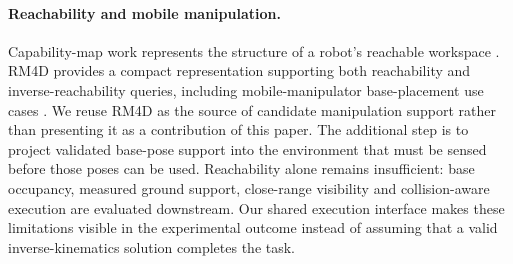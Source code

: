 \paragraph{Reachability and mobile manipulation.}
Capability-map work represents the structure of a robot's reachable workspace
\cite{zacharias2007capability}. RM4D provides a compact representation supporting
both reachability and inverse-reachability queries, including mobile-manipulator
base-placement use cases \cite{rudorfer2025rm4d}. We reuse RM4D as the source of
candidate manipulation support rather than presenting it as a contribution of
this paper. The additional step is to project validated base-pose support into
the environment that must be sensed before those poses can be used. Reachability
alone remains insufficient: base occupancy, measured ground support, close-range
visibility and collision-aware execution are evaluated downstream. Our shared
execution interface makes these limitations visible in the experimental outcome
instead of assuming that a valid inverse-kinematics solution completes the task.
